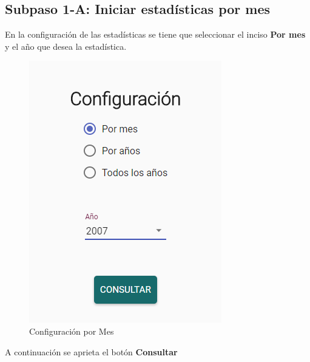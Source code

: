 \subsection{Subpaso 1-A: Iniciar estadísticas por mes}
	En la configuración de las estadísticas se tiene que seleccionar el 
	inciso \textbf{Por mes} y el año que desea la estadística. 
		
	\begin{figure}[hbtp]

	\includegraphics[scale=0.5]{images/InterfazMovil/IUGS15_configuracionMes.PNG}
	\caption{Configuración por Mes }
	\end{figure}
	A continuación se aprieta el botón \textbf{Consultar}
	
